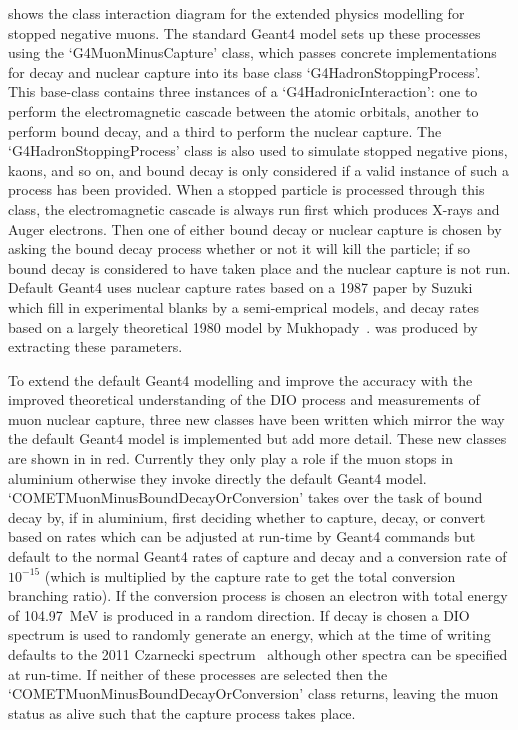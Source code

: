  shows the class interaction diagram for the extended physics modelling for stopped negative muons.
The standard Geant4 model sets up these processes using the `G4MuonMinusCapture' class, which passes concrete implementations for decay and nuclear capture into its base class `G4HadronStoppingProcess'.
This base-class contains three instances of a `G4HadronicInteraction': one to perform the electromagnetic cascade between the atomic orbitals, another to perform bound decay, and a third to perform the nuclear capture.
The `G4HadronStoppingProcess' class is also used to simulate stopped negative pions, kaons, and so on, and bound decay is only considered if a valid instance of such a process has been provided.
When a stopped particle is processed through this class, the electromagnetic cascade is always run first which produces X-rays and Auger electrons.
Then one of either bound decay or nuclear capture is chosen by asking the bound decay process whether or not it will kill the particle; if so bound decay is considered to have taken place and the nuclear capture is not run. 
Default Geant4 uses nuclear capture rates based on a 1987 paper by Suzuki \etal~\cite{Suzuki1987}  which fill in experimental blanks by a semi-emprical models, and decay rates based on a largely theoretical 1980 model by Mukhopady~\cite{Mukhopady:1980}.
 was produced by extracting these parameters.

\FigSimulationPhysicsClasses
To extend the default Geant4 modelling and improve the accuracy with the improved theoretical understanding of the \ac{DIO} process and measurements of muon nuclear capture, three new classes have been written which mirror the way the default Geant4 model is implemented but add more detail.
These new classes are shown in  in red.  
Currently they only play a role if the muon stops in aluminium otherwise they invoke directly the default Geant4 model.
`COMETMuonMinusBoundDecayOrConversion' takes over the task of bound decay by, if in aluminium, first deciding whether to capture, decay, or convert based on rates which can be adjusted at run-time by Geant4 commands but default to the normal Geant4 rates of capture and decay and a conversion rate of $10^{-15}$ (which is multiplied by the capture rate to get the total conversion branching ratio).
If the conversion process is chosen an electron with total energy of 104.97~MeV is produced in a random direction.  
If decay is chosen a \ac{DIO} spectrum is used to randomly generate an energy, which at the time of writing defaults to the 2011 Czarnecki spectrum~\cite{Czarnecki2011} although other spectra can be specified at run-time.
If neither of these processes are selected then the `COMETMuonMinusBoundDecayOrConversion' class returns, leaving the muon status as alive such that the capture process takes place.

